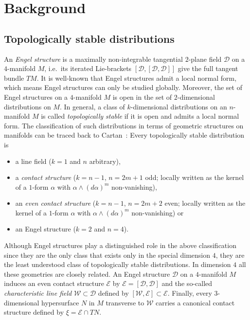 \documentclass{amsart} %
\newcommand{\D}{\mathcal{D}}
\newcommand{\E}{\mathcal{E}}
\newcommand{\W}{\mathcal{W}}
\theoremstyle{thm}
\theoremstyle{definition}
\begin{document}
\section{Background}
\label{section:back}

\subsection{Topologically stable distributions}
An \textit{Engel structure} is a maximally non-integrable tangential $2$-plane field $\D$ on a $4$-manifold $M$, i.e.\ its iterated Lie-brackets $[\D,[\D,\D]]$ give the full tangent bundle $TM$. It is well-known that Engel structures admit a local normal form, which means Engel structures can only be studied globally. 
Moreover, the set of Engel structures on a $4$-manifold $M$ is open in the set of $2$-dimensional distributions on $M$. In general, a class of $k$-dimensional distributions  on
an $n$-manifold $M$ is called \textit{topologically stable} if it is open and admits a local normal form. The classification of such distributions in terms of geometric structures on manifolds can be traced back to Cartan~\cite{Mo93,Pr16}: Every topologically stable distribution is  
\begin{itemize}
	\item a line field ($k=1$ and $n$ arbitrary),
	\item a \textit{contact structure} ($k=n-1$, $n=2m+1$ odd; locally written as the kernel of a $1$-form $\alpha$ with $\alpha\wedge (d\alpha)^m$ non-vanishing),
	\item an \textit{even contact structure} ($k=n-1$, $n=2m+2$ even; locally written as the kernel of a $1$-form $\alpha$ with $\alpha\wedge (d\alpha)^m$ non-vanishing) or
	\item an Engel structure ($k=2$ and $n=4$).
\end{itemize} 
Although Engel structures play a distinguished role in the above classification since they are the only class that exists only in the special dimension $4$, they are the least understood class of topologically stable distributions.
In dimension $4$ all these geometries are closely related. An Engel structure $\D$ on a $4$-manifold $M$ induces an even contact structure $\E$ by $\E=[\D,\D]$ and the so-called \textit{characteristic line field} $\W\subset \D$ defined by $[\W,\E]\subset \E$. Finally, every $3$-dimensional hypersurface $N$ in $M$ transverse to $\W$ carries a canonical contact structure defined by $\xi=\E\cap TN$.
\end{document}
